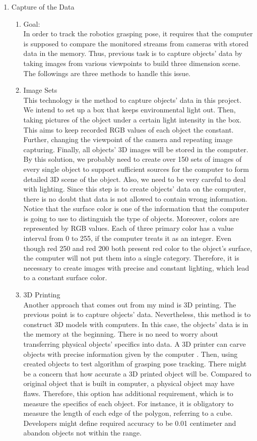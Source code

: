 \documentclass[10pt,journal,compsoc, draftclsnofoot,onecolumn]{IEEEtran}
\begin{document}
\begin{enumerate}
\item Capture of the Data
    \begin{enumerate}
    \item Goal: \\
    In order to track the robotics grasping pose, it requires that the computer is supposed to compare the monitored streams from cameras with stored data in the memory. Thus, previous task is to capture objects' data by taking images from various viewpoints to build three dimension scene. The followings are three methods to handle this issue.
    \item Image Sets \\
    This technology is the method to capture objects' data in this project. We intend to set up a box that keeps environmental light out. Then, taking pictures of the object under a certain light intensity in the box. This aims to keep recorded RGB values of each object the constant. Further, changing the viewpoint of the camera and repeating image capturing. Finally, all objects' 3D images will be stored in the computer. By this solution, we probably need to create over 150 sets of images of every single object to support sufficient sources for the computer to form detailed 3D scene of the object. Also, we need to be very careful to deal with lighting. Since this step is to create objects' data on the computer, there is no doubt that data is not allowed to contain wrong information. Notice that the surface color is one of the information that the computer is going to use to distinguish the type of objects. Moreover, colors are represented by RGB values. Each of three primary color has a value interval from 0 to 255, if the computer treats it as an integer. Even though red 250 and red 200 both present red color to the object's surface, the computer will not put them into a single category. Therefore, it is necessary to create images with precise and constant lighting, which lead to a constant surface color. 
    \item 3D Printing \\
    Another approach that comes out from my mind is 3D printing. The previous point is to capture objects' data. Nevertheless, this method is to construct 3D models with computers. In this case, the objects' data is in the memory at the beginning. There is no need to worry about transferring physical objects' specifics into data. A 3D printer can carve objects with precise information given by the computer \cite{101:online}. Then, using created objects to test algorithm of grasping pose tracking. There might be a concern that how accurate a 3D printed object will be. Compared to original object that is built in computer, a physical object may have flaws. Therefore, this option has additional requirement, which is to measure the specifics of each object. For instance, it is obligatory to measure the length of each edge of the polygon, referring to a cube. Developers might define required accuracy to be 0.01 centimeter and abandon objects not within the range. 

\end{enumerate}
\end{enumerate}
\end{document}
